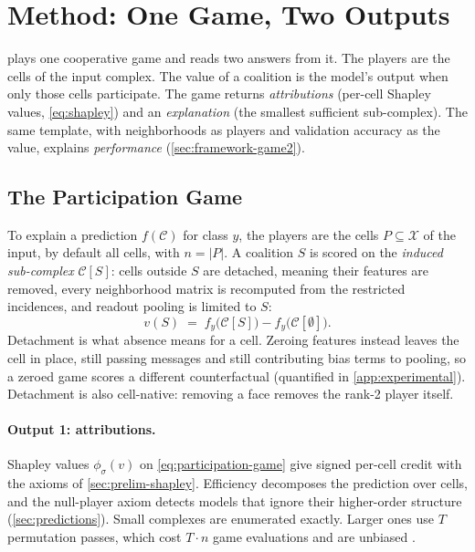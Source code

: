 \section{Method: One Game, Two Outputs}
\label{sec:framework}

\method plays one cooperative game and reads two answers from it. The
players are the cells of the input complex. The value of a coalition is
the model's output when only those cells participate. The game returns
\emph{attributions} (per-cell Shapley values, \cref{eq:shapley}) and an
\emph{explanation} (the smallest sufficient sub-complex). The same
template, with neighborhoods as players and validation accuracy as the
value, explains \emph{performance} (\cref{sec:framework-game2}).

\subsection{The Participation Game}
\label{sec:framework-game1}

To explain a prediction $f(\mathcal{C})$ for class $y$, the players are
the cells $P \subseteq \mathcal{X}$ of the input, by default all cells,
with $n = |P|$. A coalition $S$ is scored on the \emph{induced
sub-complex} $\mathcal{C}[S]$: cells outside $S$ are detached, meaning
their features are removed, every neighborhood matrix is recomputed
from the restricted incidences, and readout pooling is limited to $S$:
\begin{equation}
\label{eq:participation-game}
v(S) \;=\;
  f_{y}\bigl(\mathcal{C}[S]\bigr) - f_{y}\bigl(\mathcal{C}[\emptyset]\bigr).
\end{equation}
Detachment is what absence means for a cell. Zeroing features instead
leaves the cell in place, still passing messages and still contributing
bias terms to pooling, so a zeroed game scores a different
counterfactual (quantified in \cref{app:experimental}). Detachment is
also cell-native: removing a face removes the rank-2 player itself.

\paragraph{Output 1: attributions.}
Shapley values $\phi_\sigma(v)$ on \cref{eq:participation-game} give
signed per-cell credit with the axioms of \cref{sec:prelim-shapley}.
Efficiency decomposes the prediction over cells, and the null-player
axiom detects models that ignore their higher-order structure
(\cref{sec:predictions}). Small complexes are enumerated exactly.
Larger ones use $T$ permutation passes, which cost $T \cdot n$ game
evaluations and are unbiased \citep{castro2009polynomial}.


